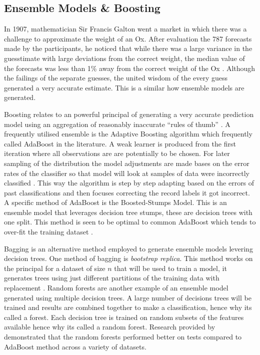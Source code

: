 \subsection{Ensemble Models \& Boosting} \label{boosting}

In 1907, mathematician Sir Francis Galton went a market in which there was a challenge
to approximate the weight of an Ox. After evaluation the 787 forecasts made by the
participants, he noticed that while there was a large variance in the guesstimate
with large deviations from the correct weight, the median value of the
forecasts was less than 1\% away from the correct weight of the Ox \citep{galton_vox_1907}. Although the failings of the separate guesses, the united wisdom of the every guess generated a very accurate estimate. This is a similar how ensemble models are generated.


Boosting relates to an powerful principal of generating a very accurate prediction model using an aggregation of reasonably inaccurate ``rules of thumb'' \citep{freund_short_1999}. A frequently utilised ensemble is the Adaptive Boosting algorithm which frequently called AdaBoost in the literature. A weak learner is produced from the first iteration where all observations are are potentially to be chosen. For later sampling of the distribution the model adjustments are made bases on the error rates of the classifier so that model will look at samples of data were incorrectly classified \citep{freund_short_1999}. This way the algorithm is step by step adapting based on the errors of past classifications and then focuses correcting the record labels it got incorrect. A specific method of AdaBoost is the Boosted-Stumps Model. This is an ensemble model that leverages decision tree stumps, these are decision trees with one split. This method is seen to be optimal to common AdaBoost which tends to over-fit the training dataset \citep{caruana_empirical_2006}.

Bagging is an alternative method employed to generate ensemble models levering decision trees. One method of bagging is \textit{bootstrap replica}. This method works on the principal for a dataset of size $n$ that will be used to train a model, it generates trees using just different partitions of the training data with replacement \citep{dietterich_experimental_2000}. Random forests are another example of an ensemble model generated using multiple decision trees. A large number of decisions trees will be trained and results are combined together to make a classification, hence why its called a forest. Each decision tree is trained on random subsets of the features available hence why its called a random forest. Research provided by \cite{breiman_random_2001} demonstrated that the random forests performed better on tests compared to AdaBoost method across a variety of datasets.


